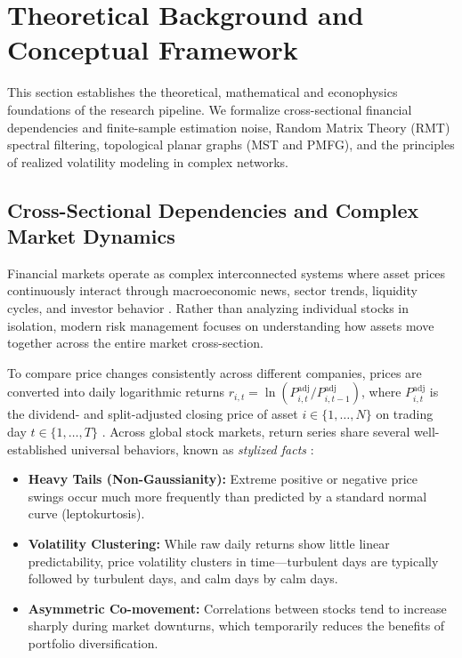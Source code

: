 \section{Theoretical Background and Conceptual Framework}
\label{sec:theoretical_background}

This section establishes the theoretical, mathematical and econophysics foundations of the research pipeline. We formalize cross-sectional financial dependencies and finite-sample estimation noise, Random Matrix Theory (RMT) spectral filtering, topological planar graphs (MST and PMFG), and the principles of realized volatility modeling in complex networks.

\subsection{Cross-Sectional Dependencies and Complex Market Dynamics}
\label{subsec:theory_market_dynamics}

Financial markets operate as complex interconnected systems where asset prices continuously interact through macroeconomic news, sector trends, liquidity cycles, and investor behavior \cite{mantegna_stanley_1999_book,bouchaud_potters_2003}. Rather than analyzing individual stocks in isolation, modern risk management focuses on understanding how assets move together across the entire market cross-section.

To compare price changes consistently across different companies, prices are converted into daily logarithmic returns $r_{i,t} = \ln(P_{i,t}^{\mathrm{adj}} / P_{i,t-1}^{\mathrm{adj}})$, where $P_{i,t}^{\mathrm{adj}}$ is the dividend- and split-adjusted closing price of asset $i \in \{1, \dots, N\}$ on trading day $t \in \{1, \dots, T\}$ \cite{campbell_1997_econometrics,tsay_2005_analysis}. Across global stock markets, return series share several well-established universal behaviors, known as \emph{stylized facts} \cite{cont_2001_empirical}:
\begin{itemize}
  \item \textbf{Heavy Tails (Non-Gaussianity):} Extreme positive or negative price swings occur much more frequently than predicted by a standard normal curve (leptokurtosis).
  \item \textbf{Volatility Clustering:} While raw daily returns show little linear predictability, price volatility clusters in time---turbulent days are typically followed by turbulent days, and calm days by calm days.
  \item \textbf{Asymmetric Co-movement:} Correlations between stocks tend to increase sharply during market downturns, which temporarily reduces the benefits of portfolio diversification.
\end{itemize}

